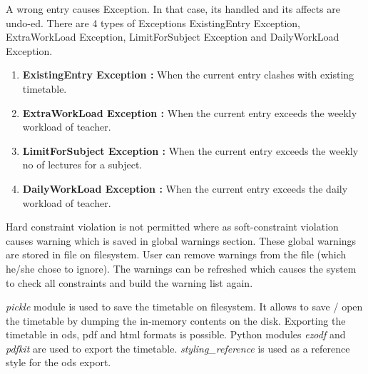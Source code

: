 \begin{algorithm}[H]
\end{algorithm}

A wrong entry causes Exception. In that case, its handled and its affects are undo-ed. There are 4 types of Exceptions ExistingEntry Exception, ExtraWorkLoad Exception, LimitForSubject Exception and DailyWorkLoad Exception.
\begin{enumerate}
\item {\bfseries ExistingEntry Exception :}  When the current entry clashes with existing timetable. 
\item {\bfseries ExtraWorkLoad Exception :} When the current entry exceeds the weekly workload of teacher.
\item {\bfseries LimitForSubject Exception :}  When the current entry exceeds the weekly no of lectures for a subject.
\item {\bfseries DailyWorkLoad Exception :}  When the current entry exceeds the daily workload of teacher.
\end{enumerate}

\newpage Hard constraint violation is not permitted where as soft-constraint violation causes warning which is saved in global warnings section. These global warnings are stored in file on filesystem. User can remove warnings from the file (which he/she chose to ignore). The warnings can be refreshed which causes the system to check all constraints and build the warning list again.

\textit{pickle} module is used to save the timetable on filesystem. It allows to save / open the timetable by dumping the in-memory contents on the disk. Exporting the timetable in ods, pdf and html formats is possible. Python modules \textit{ezodf} and \textit{pdfkit} are used to export the timetable. \textit{styling\_reference} is used as a reference style for the ods export.



 
 
